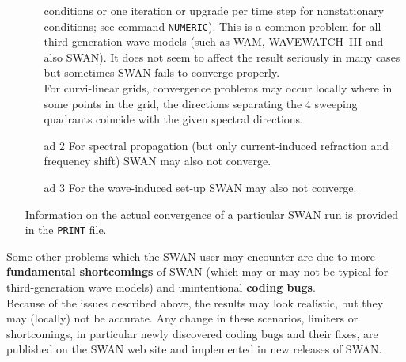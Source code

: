 \documentclass[12pt]{book}
\begin{document}
\begin{itemize}
\begin{itemize}
                       conditions or one iteration or upgrade per time step for nonstationary
                       conditions; see command {\tt NUMERIC}). This is a common problem for all
                       third-generation wave models (such as WAM, WAVEWATCH~III and also SWAN). It
                       does not seem to affect the result seriously in many cases but sometimes
                       SWAN fails to converge properly.
                       \\[2ex]
                       \noindent
                       For curvi-linear grids, convergence problems may occur locally where in some
                       points in the grid, the directions separating the 4 sweeping quadrants coincide
                       with the given spectral directions.
           \item[ad 2] For spectral propagation (but only current-induced refraction and frequency
                       shift) SWAN may also not converge.
           \item[ad 3] For the wave-induced set-up SWAN may also not converge.
         \end{itemize}
         Information on the actual convergence of a particular SWAN run is provided in the {\tt PRINT} file.
\end{itemize}
Some other problems which the SWAN user may encounter are due to more {\bf fundamental shortcomings}
of SWAN (which may or may not be typical for third-generation wave models) and unintentional {\bf coding
bugs}.
\\[2ex]
\noindent
Because of the issues described above, the results may look realistic, but they may (locally) not be
accurate. Any change in these scenarios, limiters or shortcomings, in particular newly discovered coding
bugs and their fixes, are published on the SWAN web site and implemented in new releases of SWAN.
\end{document}
